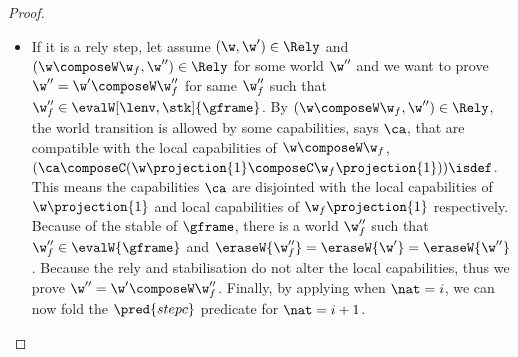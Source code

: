 \begin{proof}
\begin{itemize}
\begin{itemize}
\begin{itemize}
\item If it is a rely step, let assume \( (\w, \w') \in \Rely \) and \( (\w \composeW \w_f, \w'') \in \Rely \) for some world \( \w'' \)
and we want to prove \( \w''  = \w' \composeW \w_f'' \) for same \( \w_f'' \) such that \( \w_f'' \in \evalW[\lenv, \stk]{\gframe} \).
By \( (\w \composeW \w_f, \w'') \in \Rely \), the world transition is allowed by some capabilities, says \( \ca\), that are compatible with the local capabilities of \( \w \composeW \w_f \), \ie \( (\ca \composeC (\w\projection{1} \composeC \w_f\projection{1}) )\isdef \).
This means the capabilities \( \ca \) are disjointed with the local capabilities of \( \w\projection{1} \) and local capabilities of \( \w_f\projection{1}\) respectively.
Because of the stable of \( \gframe \), there is a world \( \w_f'' \) such that \( \w_f'' \in \evalW{\gframe}\) and \( \eraseW{\w_f''} = \eraseW{\w'} = \eraseW{\w''}\).
Because the rely and stabilisation do not alter the local capabilities, thus we prove \( \w'' = \w' \composeW \w_f'' \).
Finally, by applying \ih when \( \nat = i \), we can now fold the \( \pred{stepc} \) predicate for \( \nat = i + 1 \).
\end{itemize}
\end{itemize}
\end{itemize}

\end{proof}


